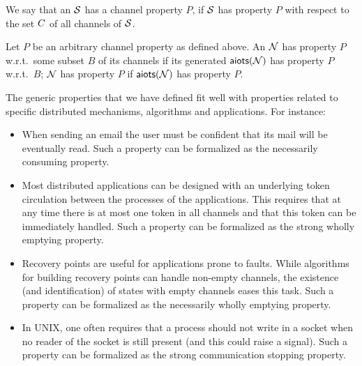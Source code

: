 
We say that an \AIOTS $\S$ has a channel property $P$, if $\S$ has property $P$ with respect to the set $\chan$ of all channels of $\S$.

\begin{definition}\label{def:cp-apn}
Let $P$ be an arbitrary channel property as defined above.
An \AIOPN $\pnN$ has property $P$ w.r.t.\ some subset $B$ of its channels
if its generated \AIOTS $\aiots(\pnN)$ has property $P$ w.r.t.\ $B$;
$\pnN$ has property $P$ if $\aiots(\pnN)$ has property $P$. 
\end{definition}

\smallskip {} The generic properties that
we have defined fit well with properties related to specific
distributed mechanisms, algorithms and applications. For instance:
\begin{itemize}
%
  \item When sending an email the user must be confident that its mail
  will be eventually read. Such a property can be formalized 
  as the necessarily consuming property. 
%
  \item Most distributed applications can be designed with an underlying token circulation
  between the processes of the applications. This requires that at any time there is
  at most one token in all channels and that this token can be immediately handled. 
  Such a property can be formalized as the strong wholly emptying property. 
%
  \item Recovery points are useful for applications prone to faults.
  While algorithms for building recovery points
  can handle non-empty channels, the existence (and identification)
  of states with empty channels eases this task.
  Such a property can be formalized as the necessarily wholly emptying property.
%
  \item In UNIX, one often requires that a process should not write in a socket
  when no reader of the socket is still present (and this could raise a signal).
  Such a property can be formalized as the strong communication stopping property.
%
\end{itemize}
